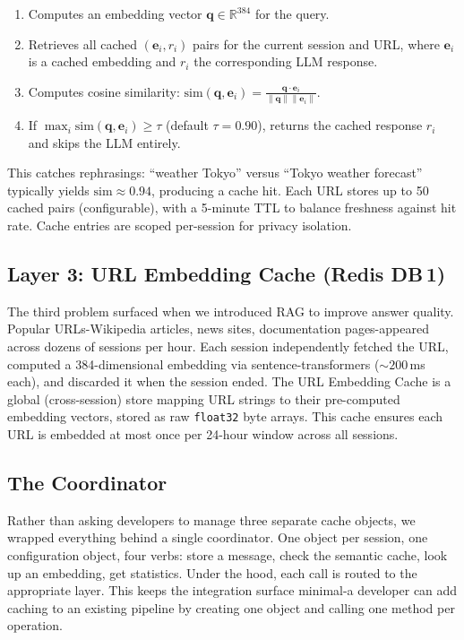 \documentclass[conference]{IEEEtran}
\begin{document}
\begin{enumerate}
\item Computes an embedding vector $\mathbf{q} \in \mathbb{R}^{384}$ for the query.
\item Retrieves all cached $(\mathbf{e}_i, r_i)$ pairs for the current session and URL, where $\mathbf{e}_i$ is a cached embedding and $r_i$ the corresponding LLM response.
\item Computes cosine similarity: $\text{sim}(\mathbf{q}, \mathbf{e}_i) = \frac{\mathbf{q} \cdot \mathbf{e}_i}{\|\mathbf{q}\| \|\mathbf{e}_i\|}$.
\item If $\max_i \text{sim}(\mathbf{q}, \mathbf{e}_i) \geq \tau$ (default $\tau{=}0.90$), returns the cached response $r_i$ and skips the LLM entirely.
\end{enumerate}

This catches rephrasings: ``weather Tokyo'' versus ``Tokyo weather forecast'' typically yields $\text{sim} \approx 0.94$, producing a cache hit. Each URL stores up to 50 cached pairs (configurable), with a 5-minute TTL to balance freshness against hit rate. Cache entries are scoped per-session for privacy isolation.

\subsection{Layer 3: URL Embedding Cache (Redis DB\,1)}

The third problem surfaced when we introduced RAG to improve answer quality. Popular URLs-Wikipedia articles, news sites, documentation pages-appeared across dozens of sessions per hour. Each session independently fetched the URL, computed a 384-dimensional embedding via sentence-transformers (${\sim}200$\,ms each), and discarded it when the session ended. The URL Embedding Cache is a global (cross-session) store mapping URL strings to their pre-computed embedding vectors, stored as raw \texttt{float32} byte arrays. This cache ensures each URL is embedded at most once per 24-hour window across all sessions.

\subsection{The Coordinator}

Rather than asking developers to manage three separate cache objects, we wrapped everything behind a single coordinator. One object per session, one configuration object, four verbs: store a message, check the semantic cache, look up an embedding, get statistics. Under the hood, each call is routed to the appropriate layer. This keeps the integration surface minimal-a developer can add caching to an existing pipeline by creating one object and calling one method per operation.
\end{document}
